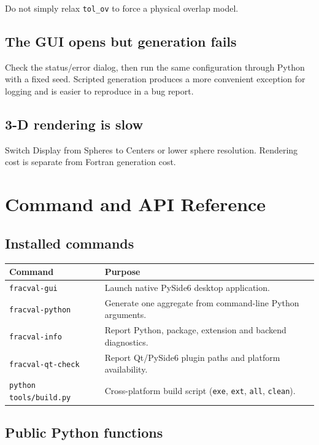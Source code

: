 \documentclass[11pt,oneside]{report}
\newcommand{\code}[1]{\texttt{#1}}
\begin{document}
Do not simply relax \code{tol\_ov} to force a physical overlap model.

\section{The GUI opens but generation fails}

Check the status/error dialog, then run the same configuration through Python
with a fixed seed. Scripted generation produces a more convenient exception for
logging and is easier to reproduce in a bug report.

\section{3-D rendering is slow}

Switch Display from Spheres to Centers or lower sphere resolution. Rendering
cost is separate from Fortran generation cost.

\chapter{Command and API Reference}

\section{Installed commands}

\begin{longtable}{p{}p{}}
\toprule
Command & Purpose \\
\midrule
\code{fracval-gui} & Launch native PySide6 desktop application. \\
\code{fracval-python} & Generate one aggregate from command-line Python arguments. \\
\code{fracval-info} & Report Python, package, extension and backend diagnostics. \\
\code{fracval-qt-check} & Report Qt/PySide6 plugin paths and platform availability. \\
\code{python tools/build.py} & Cross-platform build script (\code{exe}, \code{ext}, \code{all}, \code{clean}). \\
\bottomrule
\end{longtable}

\section{Public Python functions}
\end{document}
